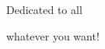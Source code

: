 
\makeatletter
\newcommand{\unchapter}[1]{%
	\begingroup
	\let\@makechapterhead\@gobble %
	\chapter*{#1}  %
	\endgroup
}
\makeatother

\unchapter{\vspace{-5cm}} 

\begin{center}
	\vspace*{\fill}
	{\large Dedicated to all \par}
	\vspace{0.5cm}
	{\LARGE whatever you want!}
	\vspace*{\fill}
\end{center}

\thispagestyle{empty}
